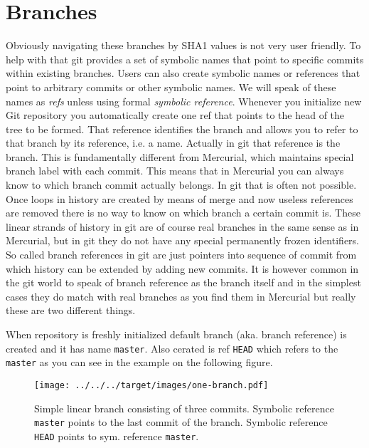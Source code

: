 \documentclass{article}
\theoremstyle{definition}
\begin{document}
        \section{Branches}

        Obviously navigating these branches by SHA1 values is not very user friendly. To help with that git provides a set
        of symbolic names that point to specific commits within existing branches. Users can also create symbolic names or
        references that point to arbitrary commits or other symbolic names. We will speak of these names as {\em refs}
        unless using formal {\em symbolic reference}. Whenever you initialize new Git repository you automatically create
        one ref that points to the head of the tree to be formed. That reference identifies the branch and allows you to refer
        to that branch by its reference, i.e. a name. Actually in git that reference is the branch. This is fundamentally
        different from Mercurial, which maintains special branch label with each commit. This means that in Mercurial you
        can always know to which branch commit actually belongs. In git that is often not possible. Once loops in history
        are created by means of merge and now useless references are removed there is no way to know on which branch a
        certain commit is. These linear strands of history in git are of course real branches in the same sense as in
        Mercurial, but in git they do not have any special permanently frozen identifiers. So called branch references in
        git are just pointers into sequence of commit from which history can be extended by adding new commits. It is
        however common in the git world to speak of branch reference as the branch itself and in the simplest cases they do
        match with real branches as you find them in Mercurial but really these are two different things.

        When repository is freshly initialized default branch (aka. branch reference) is created and it has name
        \texttt{master}. Also cerated is ref \texttt{HEAD} which refers to the \texttt{master} as you can see in the
        example on the following figure.

        \begin{figure}[h]
            \centering\texttt{[image: ../../../target/images/one-branch.pdf]}
            \caption{Simple linear branch consisting of three commits. Symbolic reference \texttt{master} points to the last
              commit of the branch. Symbolic reference \texttt{HEAD} points to sym. reference \texttt{master}.\label{fig:one-branch}}
        \end{figure}
\end{document}
